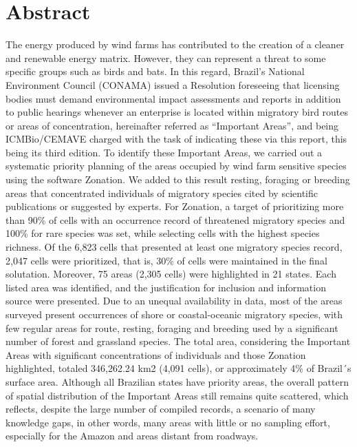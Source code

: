 \documentclass[
]{scrbook}
\begin{document}
\hypertarget{abstract}{%
\section*{Abstract}\label{abstract}}

The energy produced by wind farms has contributed to the creation of a cleaner and renewable energy matrix. However, they can represent a threat to some specific groups such as birds and bats. In this regard, Brazil's National Environment Council (CONAMA) issued a Resolution foreseeing that licensing bodies must demand environmental impact assessments and reports in addition to public hearings whenever an enterprise is located within migratory bird routes or areas of concentration, hereinafter referred as ``Important Areas'', and being ICMBio/CEMAVE charged with the task of indicating these via this report, this being its third edition. To identify these Important Areas, we carried out a systematic priority planning of the areas occupied by wind farm sensitive species using the software Zonation. We added to this result resting, foraging or breeding areas that concentrated individuals of migratory species cited by scientific publications or suggested by experts. For Zonation, a target of prioritizing more than 90\% of cells with an occurrence record of threatened migratory species and 100\% for rare species was set, while selecting cells with the highest species richness. Of the 6,823 cells that presented at least one migratory species record, 2,047 cells were prioritized, that is, 30\% of cells were maintained in the final solutation. Moreover, 75 areas (2,305 cells) were highlighted in 21 states. Each listed area was identified, and the justification for inclusion and information source were presented. Due to an unequal availability in data, most of the areas surveyed present occurrences of shore or coastal-oceanic migratory species, with few regular areas for route, resting, foraging and breeding used by a significant number of forest and grassland species. The total area, considering the Important Areas with significant concentrations of individuals and those Zonation highlighted, totaled 346,262.24 km2 (4,091 cells), or approximately 4\% of Brazil´s surface area. Although all Brazilian states have priority areas, the overall pattern of spatial distribution of the Important Areas still remains quite scattered, which reflects, despite the large number of compiled records, a scenario of many knowledge gaps, in other words, many areas with little or no sampling effort, especially for the Amazon and areas distant from roadways.
\end{document}

